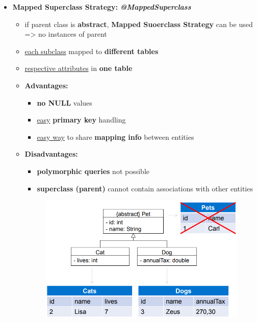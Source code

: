 \documentclass[ieeetran]{article}
\begin{document}
\begin{itemize}
\begin{itemize}
\item \textbf{Mapped Superclass Strategy:} \textit{\textbf{@MappedSuperclass}}
	\begin{itemize}
	  \item if parent class is \textbf{abstract}, \textbf{Mapped Suoerclass Strategy} can be used => no instances of parent
	\item \underline{each subclass} mapped to \textbf{different tables}
	\item \underline{respective attributes} in \textbf{one table}


\item \textbf{Advantages:}
	\begin{itemize}
	  \item \textbf{no NULL} values
	\item \underline{easy} \textbf{primary key} handling
\item \underline{easy way} to share \textbf{mapping info} between entities

	\end{itemize}

\item \textbf{Disadvantages:}
	\begin{itemize}
	  \item \textbf{polymorphic queries} not possible
	  \item \textbf{superclass (parent)} cannot contain associations with other entities 
	\end{itemize}
	\begin{figure}[h!]
	  \centering
	  \includegraphics[width=0.4\linewidth]{mappedsuperclass.png}
	  \label{fig:mappedsuperclass_png}
	\end{figure}
	\end{itemize}
	\end{itemize}


\end{itemize}
\end{document}
